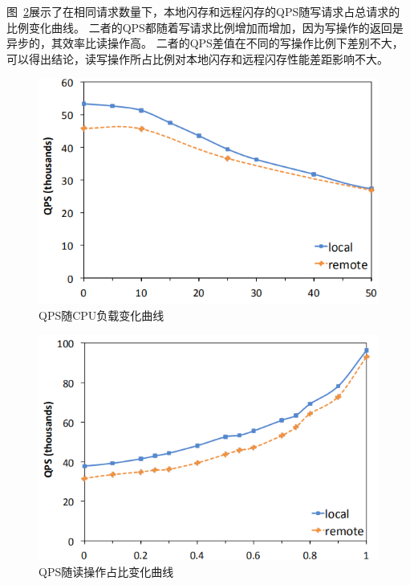 图~\ref{fig:QPS_percentage}展示了在相同请求数量下，本地闪存和远程闪存的QPS随写请求占总请求的比例变化曲线。
二者的QPS都随着写请求比例增加而增加，因为写操作的返回是异步的，其效率比读操作高。
二者的QPS差值在不同的写操作比例下差别不大，可以得出结论，读写操作所占比例对本地闪存和远程闪存性能差距影响不大。

\begin{figure}
\centering
\includegraphics[scale=0.8]{Figures/storage/QPS_CPUintensity.jpg}
\decoRule
\caption{QPS随CPU负载变化曲线}
\label{fig:QPS_CPUintensity}
\end{figure}

\begin{figure}
\centering
\includegraphics[scale=0.8]{Figures/storage/QPS_percentage.jpg}
\decoRule
\caption{QPS随读操作占比变化曲线}
\label{fig:QPS_percentage}
\end{figure}

